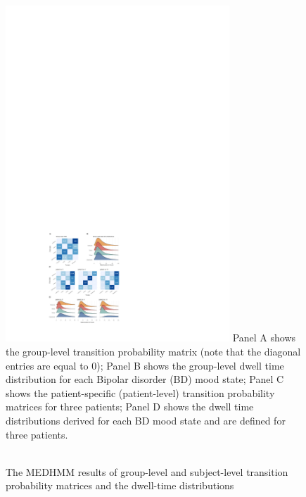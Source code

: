 \begin{figure}[]
\caption{\\The MEDHMM results of group-level and subject-level transition probability matrices and the dwell-time distributions}
 \centering
 \includegraphics[width=0.75\textwidth]{graphics/empirical_example.pdf}
 \flushleft
 \footnotesize
 \justifying
Panel A shows the group-level transition probability matrix (note that the diagonal entries are equal to $0$); Panel B shows the group-level dwell time distribution for each Bipolar disorder (BD) mood state; Panel C shows the patient-specific (patient-level) transition probability matrices for three patients; Panel D shows the dwell time distributions derived for each BD mood state and are defined for three patients.
 \label{combined_ex}
\end{figure}


